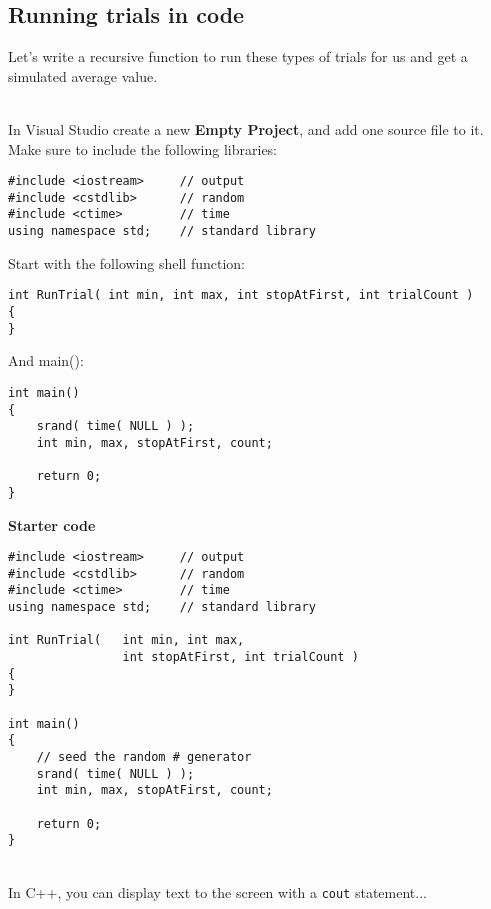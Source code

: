 \documentclass[a4paper,12pt]{book}
\begin{document}
    \newpage

    \subsection{Running trials in code}

        Let's write a recursive function to run these types of trials
        for us and get a simulated average value.

        ~\\
        In Visual Studio create a new \textbf{Empty Project}, and add
        one source file to it. Make sure to include the following libraries:

\begin{verbatim}
#include <iostream>     // output
#include <cstdlib>      // random
#include <ctime>        // time
using namespace std;    // standard library
\end{verbatim}

        Start with the following shell function:
        
\begin{verbatim}
int RunTrial( int min, int max, int stopAtFirst, int trialCount )
{
}
\end{verbatim}

        And main():

\begin{verbatim}
int main()
{
    srand( time( NULL ) );
    int min, max, stopAtFirst, count;
    
    return 0;
}
\end{verbatim}

\newpage

\textbf{Starter code}

\begin{lstlisting}[style=code]
#include <iostream>     // output
#include <cstdlib>      // random
#include <ctime>        // time
using namespace std;    // standard library

int RunTrial(   int min, int max,
                int stopAtFirst, int trialCount )
{
}

int main()
{
    // seed the random # generator
    srand( time( NULL ) );  
    int min, max, stopAtFirst, count;
    
    return 0;
}
\end{lstlisting}
    ~\\
    
    In C++, you can display text to the screen with a \texttt{cout} statement...
\end{document}
